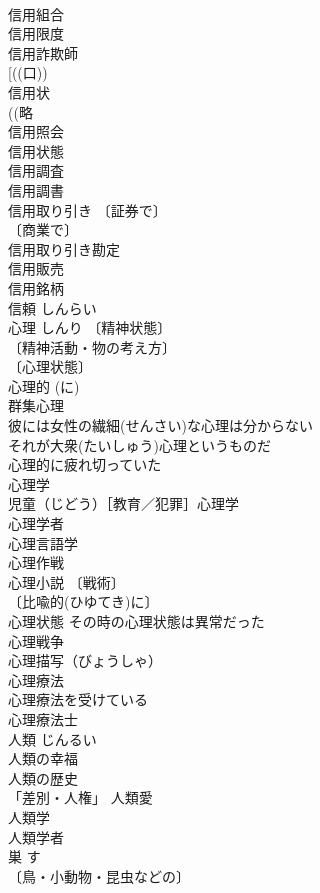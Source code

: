 \documentclass[8pt]{extreport}
\begin{document}
\begin{CJK}{UTF8}{min}
\\	信用組合 
\\	信用限度 
\\	信用詐欺師 
\\	[((口)) 
\\	信用状 
\\	((略
\\	信用照会 
\\	信用状態 
\\	信用調査 
\\	信用調書 
\\	信用取り引き 〔証券で〕
\\	〔商業で〕
\\	信用取り引き勘定 
\\	信用販売 
\\	信用銘柄 
\\	信頼	しんらい	
\\	心理	しんり	〔精神状態〕
\\	〔精神活動・物の考え方〕
\\	〔心理状態〕
\\	心理的 (に) 
\\	群集心理 
\\	彼には女性の繊細(せんさい)な心理は分からない 
\\	それが大衆(たいしゅう)心理というものだ 
\\	心理的に疲れ切っていた 
\\	心理学 
\\	児童（じどう）［教育／犯罪］心理学 
\\	心理学者 
\\	心理言語学 
\\	心理作戦 
\\	心理小説 〔戦術〕
\\	〔比喩的(ひゆてき)に〕
\\	心理状態 その時の心理状態は異常だった 
\\	心理戦争 
\\	心理描写（びょうしゃ） 
\\	心理療法 
\\	心理療法を受けている 
\\	心理療法士 
\\	人類	じんるい	
\\	人類の幸福 
\\	人類の歴史 
\\	「差別・人権」 人類愛 
\\	人類学 
\\	人類学者 
\\	巣	す	
\\	〔鳥・小動物・昆虫などの〕

\end{CJK}
\end{document}
